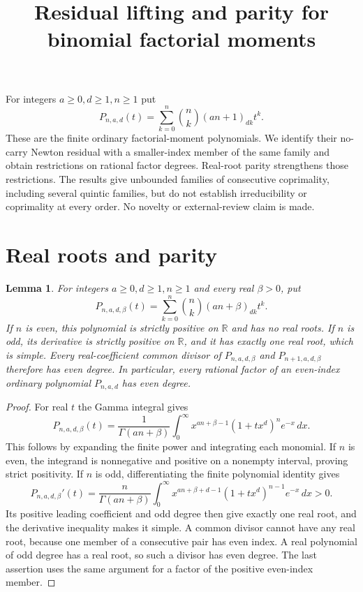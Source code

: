\documentclass[11pt]{article}
\title{Residual lifting and parity for binomial factorial moments}
\author{}
\date{}
\newtheorem{lemma}[theorem]{Lemma}
\begin{document}
\maketitle
For integers $a\ge0,d\ge1,n\ge1$ put
\[
 P_{n,a,d}(t)=\sum_{k=0}^n\binom nk(an+1)_{dk}t^k .
\]
These are the finite ordinary factorial-moment polynomials.
We identify their no-carry Newton residual with a smaller-index member
of the same family and obtain restrictions on rational factor degrees.
Real-root parity strengthens those restrictions. The results give
unbounded families of consecutive coprimality, including several quintic
families, but do not establish irreducibility or coprimality at every
order. No novelty or external-review claim is made.

\section{Real roots and parity}

\begin{lemma}\label{lem:real-root-parity}
For integers $a\ge0,d\ge1,n\ge1$ and every real $\beta>0$, put
\[
 P_{n,a,d,\beta}(t)=
 \sum_{k=0}^n\binom nk(an+\beta)_{dk}t^k.
\]
If $n$ is even, this polynomial is strictly positive on $\mathbb R$
and has no real roots. If $n$ is odd, its derivative is strictly
positive on $\mathbb R$, and it has exactly one real root, which is
simple. Every real-coefficient common divisor of
$P_{n,a,d,\beta}$ and $P_{n+1,a,d,\beta}$ therefore has even degree.
In particular, every rational factor of an even-index ordinary
polynomial $P_{n,a,d}$ has even degree.
\end{lemma}
\begin{proof}
For real $t$ the Gamma integral gives
\[
 P_{n,a,d,\beta}(t)=\frac1{\Gamma(an+\beta)}
 \int_0^\infty x^{an+\beta-1}(1+tx^d)^n e^{-x}\,dx .
 \tag{P1}
\]
This follows by expanding the finite power and integrating each monomial.
If $n$ is even, the integrand is nonnegative and positive on a nonempty
interval, proving strict positivity. If $n$ is odd, differentiating the
finite polynomial identity gives
\[
 P_{n,a,d,\beta}'(t)=\frac n{\Gamma(an+\beta)}
 \int_0^\infty x^{an+\beta+d-1}(1+tx^d)^{n-1}e^{-x}\,dx>0.
 \tag{P2}
\]
Its positive leading coefficient and odd degree then give exactly one
real root, and the derivative inequality makes it simple.
A common divisor cannot have any real root, because one member of a
consecutive pair has even index. A real polynomial of odd degree has
a real root, so such a divisor has even degree. The last assertion
uses the same argument for a factor of the positive even-index member.
\end{proof}
\end{document}
